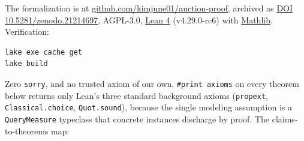 The formalization is at
\href{https://github.com/kimjune01/auction-proof}{github.com/kimjune01/auction-proof},
archived as \href{https://doi.org/10.5281/zenodo.21214697}{DOI
10.5281/zenodo.21214697}, AGPL-3.0, \href{https://lean-lang.org/}{Lean
4} (v4.29.0-rc6) with
\href{https://github.com/leanprover-community/mathlib4}{Mathlib}.
Verification:

\begin{verbatim}
lake exe cache get
lake build
\end{verbatim}

Zero \texttt{sorry}, and no trusted axiom of our own.
\texttt{\#print\ axioms} on every theorem below returns only Lean's
three standard background axioms (\texttt{propext},
\texttt{Classical.choice}, \texttt{Quot.sound}), because the single
modeling assumption is a \texttt{QueryMeasure} typeclass that concrete
instances discharge by proof. The claims-to-theorems map:

